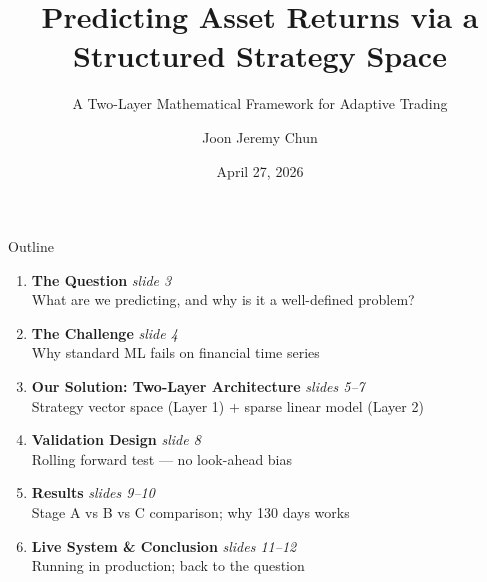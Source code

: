 \documentclass[aspectratio=169]{beamer}
\title[Strategy-Space Prediction]{Predicting Asset Returns via a\\Structured Strategy Space}
\subtitle{A Two-Layer Mathematical Framework for Adaptive Trading}
\author{Joon Jeremy Chun}
\date{April 27, 2026}
\begin{document}
\begin{frame}
  \titlepage
\end{frame}

\begin{frame}{Outline}
  \begin{enumerate}
    \item \textbf{The Question} \hfill \textit{slide 3}\\[-0.2em]
      {\small What are we predicting, and why is it a well-defined problem?}

    \vspace{0.3em}
    \item \textbf{The Challenge} \hfill \textit{slide 4}\\[-0.2em]
      {\small Why standard ML fails on financial time series}

    \vspace{0.3em}
    \item \textbf{Our Solution: Two-Layer Architecture} \hfill \textit{slides 5--7}\\[-0.2em]
      {\small Strategy vector space (Layer 1) + sparse linear model (Layer 2)}

    \vspace{0.3em}
    \item \textbf{Validation Design} \hfill \textit{slide 8}\\[-0.2em]
      {\small Rolling forward test — no look-ahead bias}

    \vspace{0.3em}
    \item \textbf{Results} \hfill \textit{slides 9--10}\\[-0.2em]
      {\small Stage A vs B vs C comparison; why 130 days works}

    \vspace{0.3em}
    \item \textbf{Live System \& Conclusion} \hfill \textit{slides 11--12}\\[-0.2em]
      {\small Running in production; back to the question}
  \end{enumerate}
\end{frame}
\end{document}
